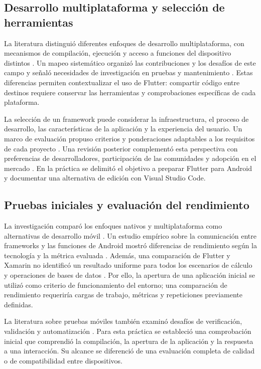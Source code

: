 \documentclass[12pt,letterpaper]{article}
\begin{document}
\subsection{Desarrollo multiplataforma y selección de herramientas}
La literatura distinguió diferentes enfoques de desarrollo multiplataforma, con mecanismos de compilación, ejecución y acceso a funciones del dispositivo distintos \citep{elkassas2017}. Un mapeo sistemático organizó las contribuciones y los desafíos de este campo y señaló necesidades de investigación en pruebas y mantenimiento \citep{zohud2019}. Estas diferencias permiten contextualizar el uso de Flutter: compartir código entre destinos requiere conservar las herramientas y comprobaciones específicas de cada plataforma.

La selección de un framework puede considerar la infraestructura, el proceso de desarrollo, las características de la aplicación y la experiencia del usuario. Un marco de evaluación propuso criterios y ponderaciones adaptables a los requisitos de cada proyecto \citep{rieger2019}. Una revisión posterior complementó esta perspectiva con preferencias de desarrolladores, participación de las comunidades y adopción en el mercado \citep{jost2025}. En la práctica se delimitó el objetivo a preparar Flutter para Android y documentar una alternativa de edición con Visual Studio Code.

\subsection{Pruebas iniciales y evaluación del rendimiento}
La investigación comparó los enfoques nativos y multiplataforma como alternativas de desarrollo móvil \citep{nawrocki2021}. Un estudio empírico sobre la comunicación entre frameworks y las funciones de Android mostró diferencias de rendimiento según la tecnología y la métrica evaluada \citep{biornhansen2020}. Además, una comparación de Flutter y Xamarin no identificó un resultado uniforme para todos los escenarios de cálculo y operaciones de bases de datos \citep{ucinski2022}. Por ello, la apertura de una aplicación inicial se utilizó como criterio de funcionamiento del entorno; una comparación de rendimiento requeriría cargas de trabajo, métricas y repeticiones previamente definidas.

La literatura sobre pruebas móviles también examinó desafíos de verificación, validación y automatización \citep{muccini2012}. Para esta práctica se estableció una comprobación inicial que comprendió la compilación, la apertura de la aplicación y la respuesta a una interacción. Su alcance se diferenció de una evaluación completa de calidad o de compatibilidad entre dispositivos.
\end{document}
